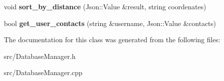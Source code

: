 \begin{DoxyCompactItemize}
\item 
void {\bfseries sort\+\_\+by\+\_\+distance} (Json\+::\+Value \&result, string coordenates)\hypertarget{classDatabaseManager_a16d509be4d787898163cb58f45902277}{}\label{classDatabaseManager_a16d509be4d787898163cb58f45902277}

\item 
bool {\bfseries get\+\_\+user\+\_\+contacts} (string \&username, Json\+::\+Value \&contacts)\hypertarget{classDatabaseManager_ad417d693e57f386a55cd170e35897454}{}\label{classDatabaseManager_ad417d693e57f386a55cd170e35897454}

\end{DoxyCompactItemize}


The documentation for this class was generated from the following files\+:\begin{DoxyCompactItemize}
\item 
src/Database\+Manager.\+h\item 
src/Database\+Manager.\+cpp\end{DoxyCompactItemize}
